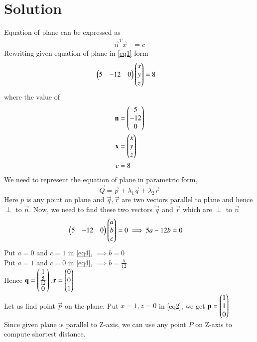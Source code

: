 \documentclass[journal,12pt,twocolumn]{IEEEtran}
\begin{document}
\section{\textbf{Solution}}
Equation of plane can be expressed as 
\begin{align}\label{eq1}
	\vec{n}^T\vec{x} &= c
\end{align}
Rewriting given equation of plane in \eqref{eq1} form
\begin{align}\label{eq2}
	\begin{pmatrix}5 & -12 & 0\end{pmatrix}\begin{pmatrix}x\\y\\z\end{pmatrix} &= 8
\end{align}
where the value of 
\begin{align}
    \mathbf{n} &= \begin{pmatrix}5\\-12\\0\end{pmatrix} \\
    \mathbf{x} &= \begin{pmatrix}x\\y\\z\end{pmatrix} \\
    c &= 8
\end{align}
We need to represent the equation of plane in parametric form,
\begin{equation}\label{eq3}
	\vec{Q} = \vec{p} + \lambda_1\vec{q} + \lambda_2\vec{r}
\end{equation}
Here $p$ is any point on plane and $\vec{q}, \vec{r}$ are two vectors parallel to plane and hence $\perp$ to $\vec{n}$. Now, we need to find these two vectors $\vec{q}$ and $\vec{r}$ which are $\perp$ to $\vec{n}$
\begin{align}
	\begin{pmatrix}5 & -12 & 0\end{pmatrix}\begin{pmatrix}a\\b\\c\end{pmatrix} = 0
	\implies 5a - 12b &= 0 \label{eq4}
\end{align}
Put $a=0$ and $c=1$ in \eqref{eq4}, $\implies b=0$\\
Put $a=1$ and $c=0$ in \eqref{eq4}, $\implies b=\frac{5}{12}$\\
Hence $\mathbf{q} = \begin{pmatrix}1\\\frac{5}{12}\\0\end{pmatrix}, \mathbf{r} = \begin{pmatrix}0\\0\\1\end{pmatrix}$\\
Let us find point $\vec{p}$ on the plane. Put $x=1,z=0$ in \eqref{eq2}, we get $\mathbf{p} = \begin{pmatrix}1\\1\\0\end{pmatrix}$\\
Since given plane is parallel to Z-axis, we can use any point $P$ on Z-axis to compute shortest distance. 
\end{document}
